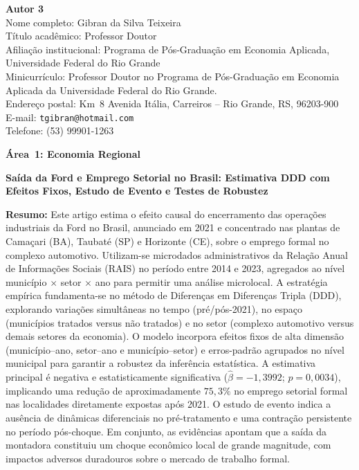\documentclass[12pt,a4paper]{article}
\begin{document}
\noindent\textbf{Autor 3}\\
Nome completo: Gibran da Silva Teixeira\\
T\'itulo acad\^emico: Professor Doutor\\
Afilia\c{c}\~ao institucional: Programa de P\'os-Gradua\c{c}\~ao em Economia Aplicada, Universidade Federal do Rio Grande\\
Minicurr\'iculo: Professor Doutor no Programa de P\'os-Gradua\c{c}\~ao em Economia Aplicada da Universidade Federal do Rio Grande.\\
Endere\c{c}o postal: Km~8 Avenida It\'alia, Carreiros -- Rio Grande, RS, 96203-900\\
E-mail: \texttt{tgibran@hotmail.com}\\
Telefone: (53) 99901-1263\\

\clearpage

\begin{center}
{\large\textbf{\'Area~1: Economia Regional}}

\bigskip

{\large\textbf{Sa\'ida da Ford e Emprego Setorial no Brasil: Estimativa DDD com
Efeitos Fixos, Estudo de Evento e Testes de Robustez}}
\end{center}

\bigskip

\noindent\textbf{Resumo:} Este artigo estima o efeito causal do encerramento das opera\c{c}\~oes industriais da Ford no Brasil, anunciado em 2021 e concentrado nas plantas de Cama\c{c}ari (BA), Taubat\'e (SP) e Horizonte (CE), sobre o emprego formal no complexo automotivo. Utilizam-se microdados administrativos da Rela\c{c}\~ao Anual de Informa\c{c}\~oes Sociais (RAIS) no per\'iodo entre 2014 e 2023, agregados ao n\'ivel munic\'ipio $\times$ setor $\times$ ano para permitir uma an\'alise microlocal. A estrat\'egia emp\'irica fundamenta-se no m\'etodo de Diferen\c{c}as em Diferen\c{c}as Tripla (DDD), explorando varia\c{c}\~oes simult\^aneas no tempo (pr\'e/p\'os-2021), no espa\c{c}o (munic\'ipios tratados versus n\~ao tratados) e no setor (complexo automotivo versus demais setores da economia). O modelo incorpora efeitos fixos de alta dimens\~ao (munic\'ipio--ano, setor--ano e munic\'ipio--setor) e erros-padr\~ao agrupados no n\'ivel municipal para garantir a robustez da infer\^encia estat\'istica. A estimativa principal \'e negativa e estatisticamente significativa ($\hat{\beta} = -1{,}3992$; $p = 0{,}0034$), implicando uma redu\c{c}\~ao de aproximadamente $75{,}3\%$ no emprego setorial formal nas localidades diretamente expostas ap\'os 2021. O estudo de evento indica a aus\^encia de din\^amicas diferenciais no pr\'e-tratamento e uma contra\c{c}\~ao persistente no per\'iodo p\'os-choque. Em conjunto, as evid\^encias apontam que a sa\'ida da montadora constituiu um choque econ\^omico local de grande magnitude, com impactos adversos duradouros sobre o mercado de trabalho formal.
\end{document}
